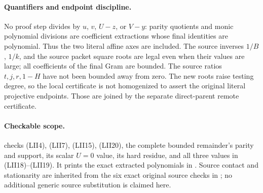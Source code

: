 \paragraph{Quantifiers and endpoint discipline.}
No proof step divides by $u$, $v$, $U-z$, or $V-y$: parity quotients
and monic polynomial divisions are coefficient extractions whose
final identities are polynomial.  Thus the two literal affine axes
are included.  The source inverses $1/B$, $1/k$, and the source
packet square roots are legal even when their values are large;
all coefficients of the final Gram are bounded.  The source ratios
$t,j,r,1-H$ have not been bounded away from zero.  The new roots
raise testing degree, so the local certificate is not homogenized
to assert the original literal projective endpoints.  Those are
joined by the separate direct-parent remote certificate.

\paragraph{Checkable scope.}
 checks (LII4), (LII7),
(LII15), (LII20), the complete bounded remainder's parity and support,
its scalar $U=0$ value, its hard residue, and all three values in
(LII18)--(LII19).  It prints the exact extracted polynomials in
.  Source contact and stationarity
are inherited from the six exact original source checks in
;
no additional generic source substitution is claimed here.
